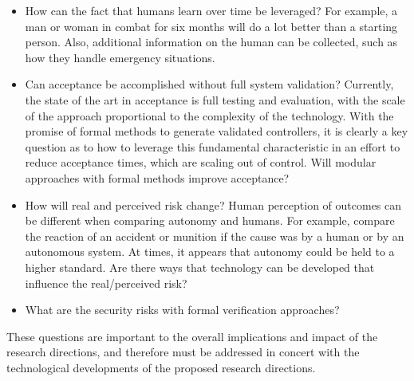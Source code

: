 \begin{itemize}
\item How can the fact that humans learn over time be leveraged? For example, a man or woman in combat for six months will do a lot better than a starting person. Also, additional information on the human can be collected, such as how they handle emergency situations. \vspace*{-0.1 in}
\item Can acceptance be accomplished without full system validation? Currently, the state of the art in acceptance is full  testing and evaluation, with the scale of the approach proportional to the complexity of the technology. With the promise of formal methods to generate validated controllers, it is clearly a key question as to how to leverage this fundamental characteristic in an effort to reduce acceptance times, which are scaling out of control. Will modular approaches with formal methods improve acceptance? \vspace*{-0.1 in}
\item How will real and perceived risk change? Human perception of outcomes can be different when comparing autonomy and humans. For example, compare the reaction of an accident or munition if the cause was by a human or by an autonomous system. At times, it appears that autonomy could be held to a higher standard. Are there ways that technology can be developed that influence the real/perceived risk? \vspace*{-0.1 in}
\item What are the security risks with formal verification approaches? \vspace*{-0.1 in}
\end{itemize}

These questions are important to the overall implications and impact of the research directions, and therefore must be addressed in concert with the technological developments of the proposed research directions. 

